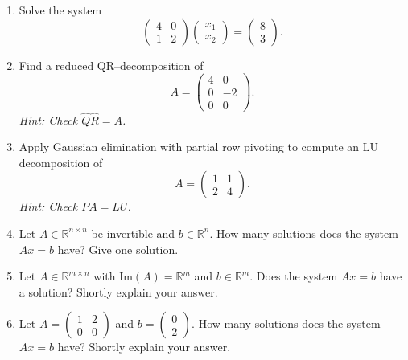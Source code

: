 \vspace*{-0.5cm}
\begin{enumerate}
	
	\item Solve the system
	$$\begin{pmatrix}
	4 & 0\\
	1 & 2
	\end{pmatrix}\begin{pmatrix}
	x_1 \\ x_2
	\end{pmatrix} = \begin{pmatrix}
	8 \\ 3
	\end{pmatrix}.  $$
	\item Find a reduced QR--decomposition of 
		$$A = \begin{pmatrix}
	4 & 0\\
	0 & -2 \\
	0 & 0
	\end{pmatrix} .$$
	\textit{Hint: Check $\widehat{Q}\widehat{R} = A$.}
	\item Apply Gaussian elimination with partial row pivoting to compute an LU decomposition of 
	$$A = \begin{pmatrix}
	1 & 1\\
	2 & 4
	\end{pmatrix} .$$
	\textit{Hint: Check $PA=LU$.}
	\item Let $A \in \mathbb{R}^{n \times n}$ be invertible and $b \in \mathbb{R}^n$. How many solutions does the system $Ax=b$ have? Give one solution.
	\item Let $A \in \mathbb{R}^{m \times n}$ with $\text{Im}(A)=\mathbb{R}^m$ and $b \in \mathbb{R}^m$. Does the system $Ax=b$ have a solution? Shortly explain your answer.
	\item Let $A = \begin{pmatrix}
	1 & 2\\
	0 & 0
	\end{pmatrix}$ and $b = \begin{pmatrix}
	0\\2
	\end{pmatrix}$. How many solutions does the system $Ax=b$ have? Shortly explain your answer.
	
\end{enumerate}
 